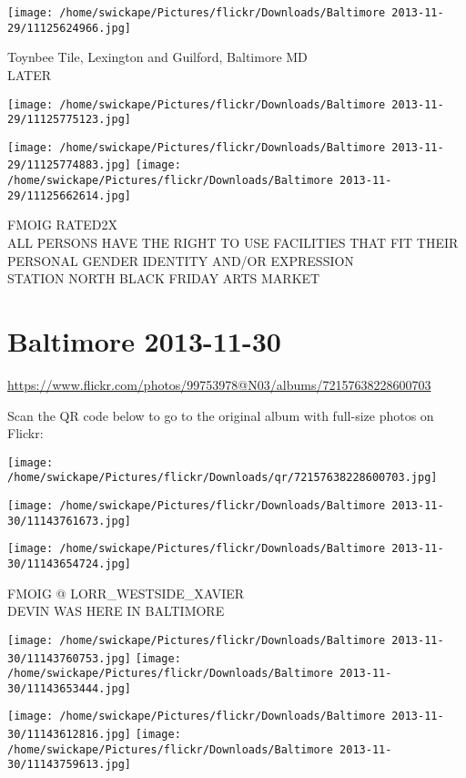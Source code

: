 \documentclass[10pt,letterpaper]{article}
\begin{document}
\vspace{0.25in}
\texttt{[image: /home/swickape/Pictures/flickr/Downloads/Baltimore 2013-11-29/11125624966.jpg]}

Toynbee Tile, Lexington and Guilford, Baltimore MD\\
LATER
\pagebreak

\texttt{[image: /home/swickape/Pictures/flickr/Downloads/Baltimore 2013-11-29/11125775123.jpg]}

\vspace{0.25in}
\texttt{[image: /home/swickape/Pictures/flickr/Downloads/Baltimore 2013-11-29/11125774883.jpg]}
\texttt{[image: /home/swickape/Pictures/flickr/Downloads/Baltimore 2013-11-29/11125662614.jpg]}

FMOIG RATED2X\\
ALL PERSONS HAVE THE RIGHT TO USE FACILITIES THAT FIT THEIR PERSONAL GENDER IDENTITY AND/OR EXPRESSION\\
STATION NORTH BLACK FRIDAY ARTS MARKET
\pagebreak

\section*{Baltimore 2013-11-30}

\url{https://www.flickr.com/photos/99753978@N03/albums/72157638228600703}

Scan the QR code below to go to the original album with full-size photos on Flickr:

\texttt{[image: /home/swickape/Pictures/flickr/Downloads/qr/72157638228600703.jpg]}
\pagebreak

\texttt{[image: /home/swickape/Pictures/flickr/Downloads/Baltimore 2013-11-30/11143761673.jpg]}

\vspace{0.25in}
\texttt{[image: /home/swickape/Pictures/flickr/Downloads/Baltimore 2013-11-30/11143654724.jpg]}

FMOIG @ LORR\_WESTSIDE\_XAVIER\\
DEVIN WAS HERE IN BALTIMORE
\pagebreak

\texttt{[image: /home/swickape/Pictures/flickr/Downloads/Baltimore 2013-11-30/11143760753.jpg]}
\texttt{[image: /home/swickape/Pictures/flickr/Downloads/Baltimore 2013-11-30/11143653444.jpg]}

\texttt{[image: /home/swickape/Pictures/flickr/Downloads/Baltimore 2013-11-30/11143612816.jpg]}
\texttt{[image: /home/swickape/Pictures/flickr/Downloads/Baltimore 2013-11-30/11143759613.jpg]}
\end{document}

